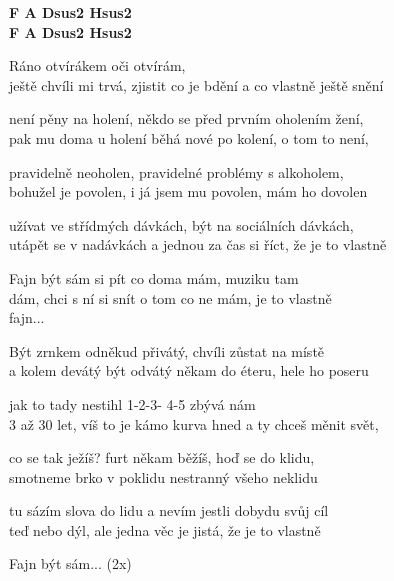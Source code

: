 
\re{}
{\footnotesize\textbf{F\guitarSharp{} A Dsus2 Hsus2}}\\
{\footnotesize\textbf{F\guitarSharp{} A Dsus2 Hsus2}}

\ve{}
Ráno otvírákem oči otvírám,\\
ještě chvíli mi trvá, zjistit co je bdění a co vlastně ještě snění

\ve{}
není pěny na holení, někdo se před prvním oholením žení,\\
pak mu doma u holení běhá nové po kolení, o tom to není,

\ve{}
pravidelně neoholen, pravidelné problémy s alkoholem,\\
bohužel je povolen, i já jsem mu povolen, mám ho dovolen

\ve{}
užívat ve střídmých dávkách, být na sociálních dávkách,\\
utápět se v nadávkách a jednou za čas si říct, že je to vlastně

\cho{}
Fajn být sám si pít co doma mám, muziku tam\\
dám, chci s ní si snít o tom co ne mám, je to vlastně\\
fajn... 

\ve{}
Být zrnkem odněkud přivátý, chvíli zůstat na místě\\
a kolem devátý být odvátý někam do éteru, hele ho poseru

\ve{}
jak to tady nestihl 1-2-3- 4-5 zbývá nám\\
3 až 30 let, víš to je kámo kurva hned a ty chceš měnit svět,

\ve{}
co se tak ježíš? furt někam běžíš, hoď se do klidu,\\
smotneme brko v poklidu nestranný všeho neklidu

\ve{}
tu sázím slova do lidu a nevím jestli dobydu svůj cíl\\
teď nebo dýl, ale jedna věc je jistá, že je to vlastně

\cho{}
Fajn být sám... (2x)

\esong{}
